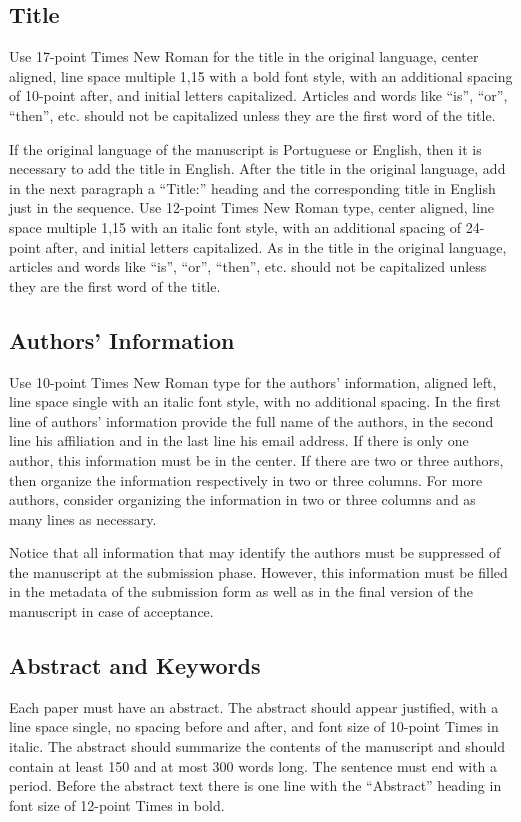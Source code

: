 \documentclass[english, spanish, brazilian]{RBIEarticle} %
\begin{document}
\subsection{Title}
Use 17-point Times New Roman for the title in the original language, center aligned, line space multiple 1,15 with a bold font style, with an additional spacing of 10-point after, and initial letters capitalized. Articles and words like ``is'', ``or'', ``then'', etc. should not be capitalized unless they are the first word of the title.

If the original language of the manuscript is Portuguese or English, then it is necessary to add the title in English. After the title in the original language, add in the next paragraph a “Title:” heading and the corresponding title in English just in the sequence. Use 12-point Times New Roman type, center aligned, line space multiple 1,15 with an italic font style, with an additional spacing of 24-point after, and initial letters capitalized. As in the title in the original language, articles and words like ``is'', ``or'', ``then'', etc. should not be capitalized unless they are the first word of the title.


\subsection{Authors’ Information}
Use 10-point Times New Roman type for the authors’ information, aligned left, line space single with an italic font style, with no additional spacing. In the first line of authors’ information provide the full name of the authors, in the second line his affiliation and in the last line his email address. If there is only one author, this information must be in the center. If there are two or three authors, then organize the information respectively in two or three columns. For more authors, consider organizing the information in two or three columns and as many lines as necessary.

Notice that all information that may identify the authors must be suppressed of the manuscript at the submission phase. However, this information must be filled in the metadata of the submission form as well as in the final version of the manuscript in case of acceptance.


\subsection{Abstract and Keywords}
Each paper must have an abstract. The abstract should appear justified, with a line space single, no spacing before and after, and font size of 10-point Times in italic. The abstract should summarize the contents of the manuscript and should contain at least 150 and at most 300 words long. The sentence must end with a period. Before the abstract text there is one line with the ``Abstract'' heading in font size of 12-point Times in bold.
\end{document}
